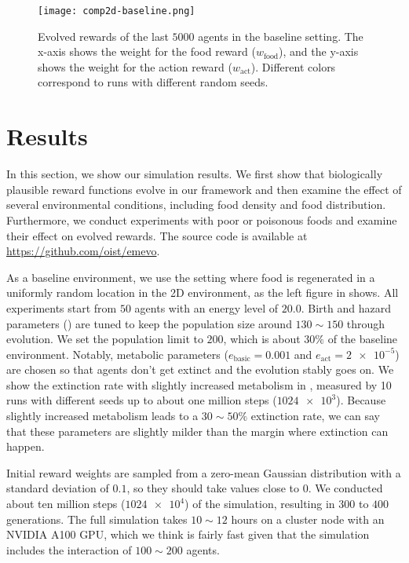 \begin{figure}[t]
  \centering
  \texttt{[image: comp2d-baseline.png]}
  \caption{
    Evolved rewards of the last $5000$ agents in the baseline setting.
    The x-axis shows the weight for the food reward ($w_{\mathrm{food}}$), and the y-axis shows the weight for the action reward ($w_{\mathrm{act}}$).
    Different colors correspond to runs with different random seeds.
  }\label{figure:result-baseline}
\end{figure}

\section{Results}
In this section, we show our simulation results. We first show that biologically plausible reward functions evolve in our framework and then examine the effect of several environmental conditions, including food density and food distribution. Furthermore, we conduct experiments with poor or poisonous foods and examine their effect on evolved rewards. The source code is available at \url{https://github.com/oist/emevo}.

As a baseline environment, we use the setting where food is regenerated in a uniformly random location in the 2D environment, as the left figure in  shows. All experiments start from $50$ agents with an energy level of $20.0$. Birth and hazard parameters () are tuned to keep the population size around $130\sim 150$ through evolution. We set the population limit to $200$, which is about $30\%$ of the baseline environment.  Notably, metabolic parameters ($e_{\mathrm{basic}} = 0.001$ and $e_{\mathrm{act}} = \num{2e-5}$) are chosen so that agents don't get extinct and the evolution stably goes on. We show the extinction rate with slightly increased metabolism in , measured by 10 runs with different seeds up to about one million steps ($\num{1024e3}$). Because slightly increased metabolism leads to a $30\sim50\%$ extinction rate, we can say that these parameters are slightly milder than the margin where extinction can happen.

Initial reward weights are sampled from a zero-mean Gaussian distribution with a standard deviation of $0.1$, so they should take values close to $0$. We conducted about ten million steps ($\num{1024e4}$) of the simulation, resulting in $300$ to $400$ generations. The full simulation takes $10\sim12$ hours on a cluster node with an NVIDIA A100 GPU, which we think is fairly fast given that the simulation includes the interaction of $100\sim200$ agents.

